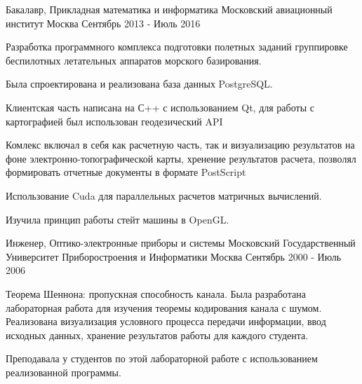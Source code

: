 

\begin{cventries}

  \cventry
    {Бакалавр, Прикладная математика и информатика} %
    {Московский авиационный институт} %
    {Москва} %
    {Сентябрь 2013 - Июль 2016} %
    {
      \begin{cvitems} %
        \item {Разработка программного комплекса подготовки полетных заданий группировке беспилотных летательных аппаратов морского базирования.}
        \item {Была спроектирована и реализована база данных PostgreSQL.}
        \item {Клиентская часть написана на С++ с использованием Qt, для работы с картографией был использован геодезический API}
        \item {Комлекс включал в себя как расчетную часть, так и визуализацию результатов на фоне электронно-топографической карты, хренение результатов расчета, позволял формировать отчетные документы в формате PostScript}   
        \item {Использование Cuda для параллельных расчетов матричных вычислений.} 
        \item {Изучила принцип работы стейт машины в OpenGL.}   
      \end{cvitems}
    }
  \cventry
    {Инженер, Оптико-электронные приборы и системы} %
    {Московский Государственный Университет Приборостроения и Информатики} %
    {Москва} %
    {Сентябрь 2000 - Июль 2006} %
    {
      \begin{cvitems} %
        \item {Теорема Шеннона: пропускная способность канала. Была разработана лабораторная работа для изучения теоремы кодирования канала с шумом. Реализована визуализация условного процесса передачи информации, ввод исходных данных, хранение результатов работы для каждого студента.}
        \item {Преподавала у студентов по этой лабораторной работе с использованием реализованной программы.}
      \end{cvitems}
    }

\end{cventries}
